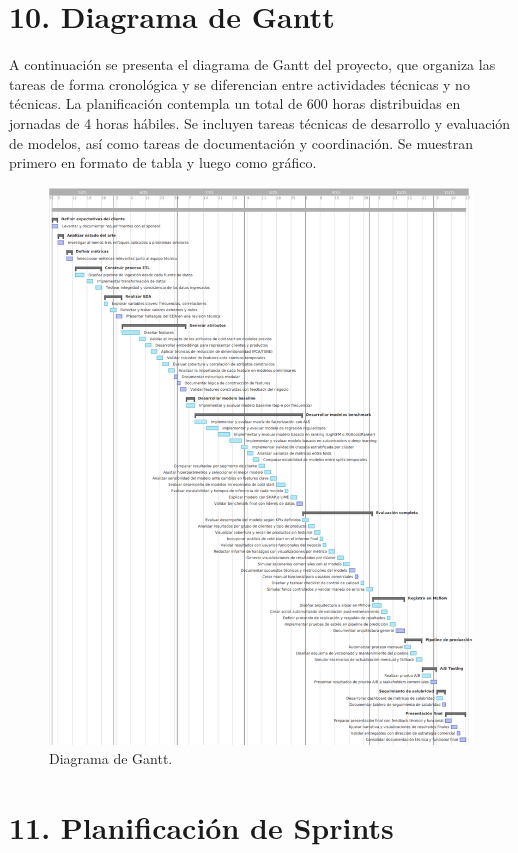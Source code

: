 \documentclass[
11pt, %
]{charter}
\begin{document}
\section{10. Diagrama de Gantt}
\label{sec:gantt}

A continuación se presenta el diagrama de Gantt del proyecto, que organiza las tareas de forma cronológica y se diferencian entre actividades técnicas y no técnicas. La planificación contempla un total de 600 horas distribuidas en jornadas de 4 horas hábiles. Se incluyen tareas técnicas de desarrollo y evaluación de modelos, así como tareas de documentación y coordinación. Se muestran primero en formato de tabla y luego como gráfico.

\begin{figure}[htpb]
\centering 
\includegraphics[height=.95\textheight]{./Figuras/Gantt.png}
\caption{Diagrama de Gantt.} 
\label{fig:diagGantt}
\end{figure}

\section{11. Planificación de Sprints}
\end{document}
